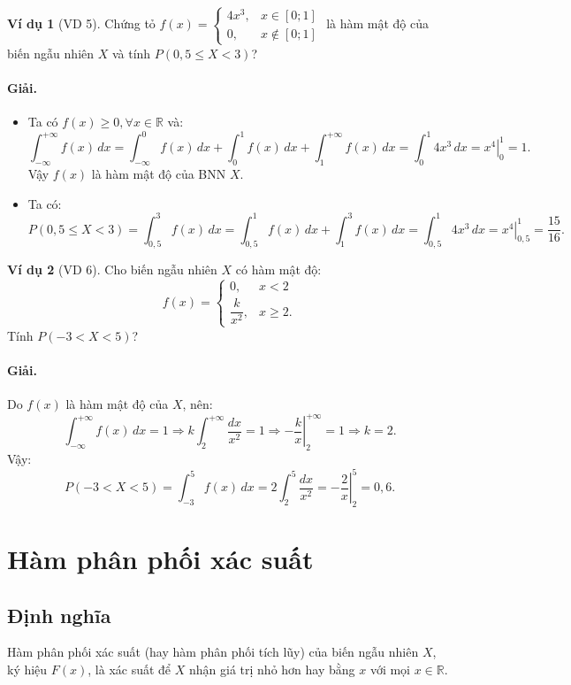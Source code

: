 \documentclass[12pt,a4paper]{article}
\theoremstyle{definition}
\newtheorem{vidu}{Ví dụ}[section]
\begin{document}
\begin{vidu}[VD 5]
Chứng tỏ $f(x) = \begin{cases} 4x^3, & x \in [0; 1] \\ 0, & x \notin [0; 1] \end{cases}$ là hàm mật độ của biến ngẫu nhiên $X$ và tính $P(0{,}5 \le X < 3)$?

\paragraph{Giải.}
\begin{itemize}
    \item Ta có $f(x) \ge 0, \forall x \in \mathbb{R}$ và:
    \[
    \int_{-\infty}^{+\infty} f(x)\,dx = \int_{-\infty}^0 f(x)\,dx + \int_0^1 f(x)\,dx + \int_1^{+\infty} f(x)\,dx = \int_0^1 4x^3\,dx = \left.x^4\right|_0^1 = 1.
    \]
    Vậy $f(x)$ là hàm mật độ của BNN $X$.
    \item Ta có:
    \[
    P(0{,}5 \le X < 3) = \int_{0{,}5}^3 f(x)\,dx = \int_{0{,}5}^1 f(x)\,dx + \int_1^3 f(x)\,dx = \int_{0{,}5}^1 4x^3\,dx = \left.x^4\right|_{0{,}5}^1 = \frac{15}{16}.
    \]
\end{itemize}
\end{vidu}

\begin{vidu}[VD 6]
Cho biến ngẫu nhiên $X$ có hàm mật độ:
\[
f(x) = \begin{cases}
0, & x < 2 \\
\dfrac{k}{x^2}, & x \ge 2.
\end{cases}
\]
Tính $P(-3 < X < 5)$?

\paragraph{Giải.} Do $f(x)$ là hàm mật độ của $X$, nên:
\[
\int_{-\infty}^{+\infty} f(x)\,dx = 1 \Rightarrow k \int_2^{+\infty} \frac{dx}{x^2} = 1 \Rightarrow \left.-\frac{k}{x}\right|_2^{+\infty} = 1 \Rightarrow k = 2.
\]
Vậy:
\[
P(-3 < X < 5) = \int_{-3}^5 f(x)\,dx = 2 \int_2^5 \frac{dx}{x^2} = \left.-\frac{2}{x}\right|_2^5 = 0{,}6.
\]
\end{vidu}

\section{Hàm phân phối xác suất}

\subsection{Định nghĩa}
Hàm phân phối xác suất (hay hàm phân phối tích lũy) của biến ngẫu nhiên $X$, ký hiệu $F(x)$, là xác suất để $X$ nhận giá trị nhỏ hơn hay bằng $x$ với mọi $x \in \mathbb{R}$.
\end{document}
